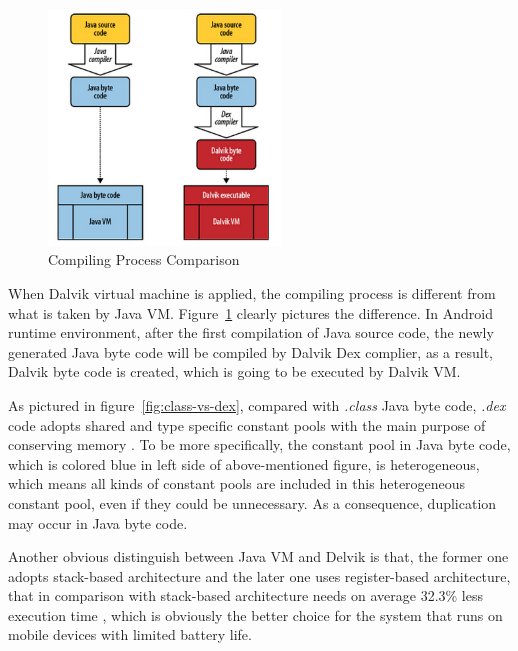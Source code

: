  \begin{figure}[!htb]
	\centering
	\includegraphics[width=0.55\textwidth]{vm-compare.jpg}
		\caption{Compiling Process Comparison \cite{learn_android}}
	\label{fig:vm-compare}
\end{figure}
When Dalvik virtual machine is applied, the compiling process is different from what is taken by Java VM. Figure~\ref{fig:vm-compare} clearly pictures the difference. In Android runtime environment, after the first compilation of Java source code, the newly generated Java byte code will be compiled by Dalvik Dex complier, as a result, Dalvik byte code is created, which is going to be executed by Dalvik VM.

As pictured in figure~\ref{fig:class-vs-dex}, compared with \emph{.class} Java byte code, \emph{.dex} code adopts shared and type specific constant pools with the main purpose of conserving memory \cite{android_vm}. To be more specifically,  the constant pool in Java byte code, which is colored blue in left side of above-mentioned figure, is heterogeneous, which means all kinds of constant pools are included in this heterogeneous constant pool, even if they could be unnecessary. As a consequence, duplication may occur in Java byte code.    

Another obvious distinguish between Java VM and Delvik is that, the former one adopts stack-based architecture and  the later one uses register-based architecture, that in comparison with stack-based architecture needs on average 32.3\% less execution time \cite{android_vm}, which is obviously the better choice for the system that runs on mobile devices with limited battery life.

